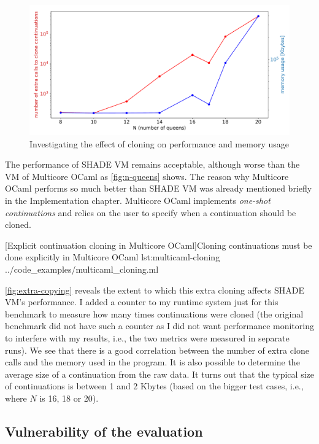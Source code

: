 \documentclass[class=article, crop=false]{standalone}
\begin{document}
\begin{figure}
    \centering
    \includegraphics[height=.3\textheight]{eval_plots/extra_cloning.pdf}
    \caption[Correlation between extra cloning and memory usage]{Investigating the effect of cloning on performance and memory usage}
    \label{fig:extra-copying}
\end{figure}

The performance of SHADE VM remains acceptable, although worse than the VM of
Multicore OCaml as \autoref{fig:n-queens} shows.
%
The reason why Multicore OCaml performs so much better than SHADE VM was
already mentioned briefly in the Implementation chapter. Multicore OCaml implements
\emph{one-shot continuations} and relies on the user to specify when a continuation
should be cloned.

{[Explicit continuation cloning in Multicore OCaml]Cloning continuations must be done explicitly in Multicore OCaml}
{lst:multicaml-cloning}
{../code_examples/multicaml_cloning.ml}

\autoref{fig:extra-copying} reveals the extent to which this extra cloning
affects SHADE VM's performance. I added a counter to my runtime system just for
this benchmark to measure how many times continuations were cloned (the original
benchmark did not have such a counter as I did not want performance monitoring
to interfere with my results, i.e., the two metrics were measured in separate
runs). We see that there is a good correlation between the number of extra
clone calls and the memory used in the program. It is also possible to determine
the average size of a continuation from the raw data. It turns out that the typical
size of continuations is between 1 and 2 Kbytes (based on the bigger test cases, i.e.,
where $N$ is 16, 18 or 20).

\subsection{Vulnerability of the evaluation}
\end{document}
